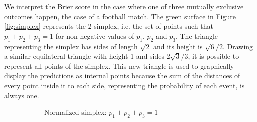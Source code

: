 \documentclass[journal,article,accept,moreauthors,pdftex,12pt,a4paper]{mdpi}
\begin{document}
We interpret the Brier score in the case where one of three mutually exclusive outcomes happen, the case of a football match.
The green surface in Figure \ref{fig:simplex} represents the 2-simplex, i.e. the set of points such that $p_1+p_2+p_3=1$ for non-negative values of $p_1$, $p_2$ and $p_3$.
The triangle representing the simplex has sides of length $\sqrt{2}$ and its height is $\sqrt{6}/2$.
Drawing a similar equilateral triangle with height 1 and sides $2\sqrt{3}/3$, it is possible to represent all points of the simplex.
This new triangle is used to graphically display the predictions as internal points because the sum of the distances of every point inside it to each side, representing the probability of each event, is always one.

\begin{figure}[!ht]
    \centering
    \begin{subfigure}[b]{0.48\linewidth}        %
        \centering



        \caption{Normalized simplex: $p_1+p_2+p_3=1$}
        \label{fig:A}
    \end{subfigure}
    \begin{subfigure}[b]{0.48\linewidth}        %
        \centering

\end{subfigure}
\end{figure}
\end{document}
